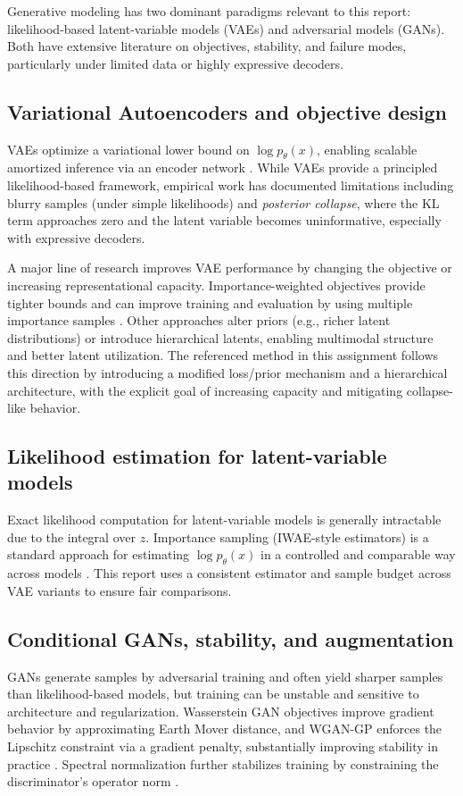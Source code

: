 
Generative modeling has two dominant paradigms relevant to this report: likelihood-based latent-variable models (VAEs) and adversarial models (GANs). Both have extensive literature on objectives, stability, and failure modes, particularly under limited data or highly expressive decoders.

\subsection{Variational Autoencoders and objective design}
VAEs optimize a variational lower bound on $\log p_\theta(x)$, enabling scalable amortized inference via an encoder network \citep{kingma2014vae,rezende2014stochastic}. While VAEs provide a principled likelihood-based framework, empirical work has documented limitations including blurry samples (under simple likelihoods) and \emph{posterior collapse}, where the KL term approaches zero and the latent variable becomes uninformative, especially with expressive decoders.

A major line of research improves VAE performance by changing the objective or increasing representational capacity. Importance-weighted objectives provide tighter bounds and can improve training and evaluation by using multiple importance samples \citep{burda2016iwae}. Other approaches alter priors (e.g., richer latent distributions) or introduce hierarchical latents, enabling multimodal structure and better latent utilization. The referenced method in this assignment follows this direction by introducing a modified loss/prior mechanism and a hierarchical architecture, with the explicit goal of increasing capacity and mitigating collapse-like behavior.

\subsection{Likelihood estimation for latent-variable models}
Exact likelihood computation for latent-variable models is generally intractable due to the integral over $z$. Importance sampling (IWAE-style estimators) is a standard approach for estimating $\log p_\theta(x)$ in a controlled and comparable way across models \citep{burda2016iwae}. This report uses a consistent estimator and sample budget across VAE variants to ensure fair comparisons.

\subsection{Conditional GANs, stability, and augmentation}
GANs generate samples by adversarial training and often yield sharper samples than likelihood-based models, but training can be unstable and sensitive to architecture and regularization. Wasserstein GAN objectives improve gradient behavior by approximating Earth Mover distance, and WGAN-GP enforces the Lipschitz constraint via a gradient penalty, substantially improving stability in practice \citep{gulrajani2017improved}. Spectral normalization further stabilizes training by constraining the discriminator's operator norm \citep{miyato2018sn}.

